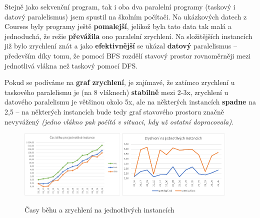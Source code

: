 Stejně jako sekvenční program, tak i oba dva paralelní programy (taskový i datový paralelismus) jsem spustil na školním počítači. Na ukázkových datech z Courses byly programy ještě \textbf{pomalejší}, jelikož byla tato data tak malá a jednoduchá, že režie \textbf{převážila} ono paralelní zrychlení. Na složitějších instancích již bylo zrychlení znát a jako \textbf{efektivnější} se ukázal \textbf{datový} paralelismus -- především díky tomu, že pomocí BFS rozdělí stavový prostor rovnoměrněji mezi jednotlivá vlákna než taskový pomocí DFS.

Pokud se podíváme na \textbf{graf zrychlení}, je zajímavé, že zatímco zrychlení u taskového paralelismu je (na 8 vláknech) \textbf{stabilně} mezi 2-3x, zrychlení u datového paralelismu je většinou okolo 5x, ale na některých instancích \textbf{spadne} na 2,5 -- na některých instancích bude tedy graf stavového prostoru značně nevyvážený \textit{(jedno vlákno pak počítá v situaci, kdy už ostatní dopracovala)}.

\begin{figure}[H]
    \centering
    \includegraphics[width=0.45\textwidth]{fig/2_1.pdf}
    \includegraphics[width=0.485\textwidth]{fig/2_2.pdf}
    \caption{Časy běhu a zrychlení na jednotlivých instancích}
\end{figure}
